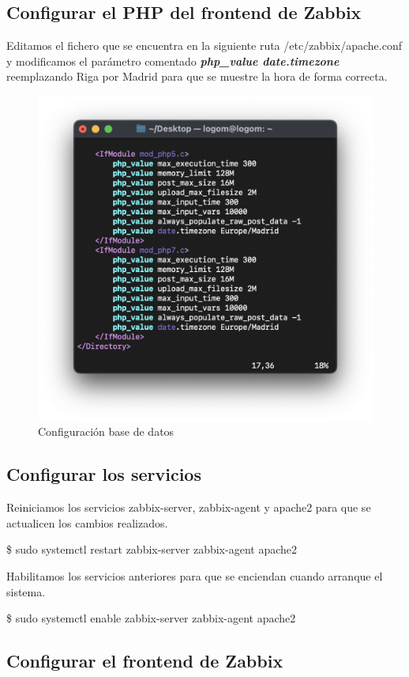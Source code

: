     \subsection{Configurar el PHP del frontend de Zabbix}
    Editamos el fichero que se encuentra en la siguiente ruta /etc/zabbix/apache.conf y modificamos el parámetro comentado \textbf{\emph{php\_value date.timezone}} reemplazando Riga
    por Madrid para que se muestre la hora de forma correcta.
    \begin{figure}[H]
        \centering
        \includegraphics[scale=0.5]{images/apache_conf.png}
        \caption{Configuración base de datos}
        \label{fig:apache_conf}
    \end{figure}

    \subsection{Configurar los servicios}
    Reiniciamos los servicios zabbix-server, zabbix-agent y apache2 para que se actualicen los cambios realizados.
        \begin{tcolorbox}[colback=black!10, halign=left]
            \$ sudo systemctl restart zabbix-server zabbix-agent apache2
        \end{tcolorbox}

    Habilitamos los servicios anteriores para que se enciendan cuando arranque el sistema.
        \begin{tcolorbox}[colback=black!10, halign=left]
            \$ sudo systemctl enable zabbix-server zabbix-agent apache2
        \end{tcolorbox}

    \subsection{Configurar el frontend de Zabbix}


